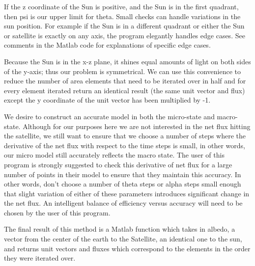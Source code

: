 \documentclass[12pt]{article}
\begin{document}
If the z coordinate of the Sun is positive, and the Sun is in the first quadrant, then psi is our upper limit for theta. Small checks can handle variations in the sun position. For example if the Sun is in a different quadrant or either the Sun or satellite is exactly on any axis, the program elegantly handles edge cases. See comments in the Matlab code for explanations of specific edge cases.

Because the Sun is in the x-z plane, it shines equal amounts of light on both sides of the y-axis; thus our problem is symmetrical. We can use this convenience to reduce the number of area elements that need to be iterated over in half and for every element iterated return an identical result (the same unit vector and flux) except the y coordinate of the unit vector has been multiplied by -1.

We desire to construct an accurate model in both the micro-state and macro-state. Although for our purposes here we are not interested in the net flux hitting the satellite, we still want to ensure that we choose a number of steps where the derivative of the net flux with respect to the time steps is small, in other words, our micro model still accurately reflects the macro state. The user of this program is strongly suggested to check this derivative of net flux for a large number of points in their model to ensure that they maintain this accuracy. In other words, don't choose a number of theta steps or alpha steps small enough that slight variation of either of these parameters introduces significant change in the net flux. An intelligent balance of efficiency versus accuracy will need to be chosen by the user of this program.

The final result of this method is a Matlab function which takes in albedo, a vector from the center of the earth to the Satellite, an identical one to the sun, and returns unit vectors and fluxes which correspond to the elements in the order they were iterated over.
 
\end{document}
